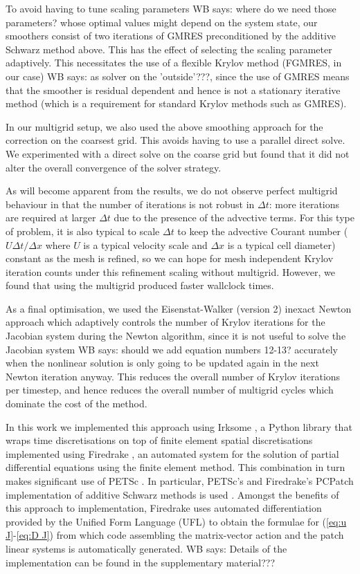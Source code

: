 \documentclass[a4paper, 12pt]{article}
\newcommand{\werner}[1]{{\color{magenta}WB says: #1}}
\begin{document}
To avoid having to tune scaling parameters \werner{where do we need those parameters?} whose optimal values might
depend on the system state, our smoothers consist of two iterations of
GMRES preconditioned by the additive Schwarz method above. This has
the effect of selecting the scaling parameter adaptively.  This
necessitates the use of a flexible Krylov method (FGMRES, in our
case) \werner{as solver on the 'outside'???}, since the use of GMRES means that the smoother is residual
dependent and hence is not a stationary iterative method (which is a
requirement for standard Krylov methods such as GMRES).

In our multigrid setup, we also used the above smoothing approach for
the correction on the coarsest grid. This avoids having to use a
parallel direct solve. We experimented with a direct solve on the coarse
grid but found that it did not alter the overall convergence of the
solver strategy.

As will become apparent from the results, we do not observe perfect
multigrid behaviour in that the number of iterations is not robust in
$\Delta t$: more iterations are required at larger $\Delta t$ due to
the presence of the advective terms.  For this type of problem, it is
also typical to scale $\Delta t$ to keep the advective Courant number
($U\Delta t/\Delta x$ where $U$ is a typical velocity scale and
$\Delta x$ is a typical cell diameter) constant as the mesh is
refined, so we can hope for mesh independent Krylov iteration counts
under this refinement scaling without multigrid. However, we found
that using the multigrid produced faster wallclock times.

As a final optimisation, we used the Eisenstat-Walker (version 2)
inexact Newton approach \citep{eisenstat1996choosing} which adaptively
controls the number of Krylov iterations for the Jacobian system
during the Newton algorithm, since it is not useful to solve the
Jacobian system \werner{should we add equation numbers 12-13?} accurately when the nonlinear solution is only going
to be updated again in the next Newton iteration anyway. This reduces the overall
number of Krylov iterations per timestep, and hence reduces the overall
number of multigrid cycles which dominate the cost of the method.

In this work we implemented this approach using Irksome
\citep{farrell2021irksome,kirby2024extending}, a Python library that
wraps time discretisations on top of finite element spatial
discretisations implemented using Firedrake
\citep{FiredrakeUserManual}, an automated system for the solution of
partial differential equations using the finite element method.  This
combination in turn makes significant use of PETSc
\citep{dalcin2011parallel,balay2019petsc}. In particular, PETSc's and
Firedrake's PCPatch implementation of additive Schwarz methods is used
\citep{farrell2021pcpatch}.  Amongst the benefits of this approach to
implementation, Firedrake uses automated differentiation provided by
the Unified Form Language (UFL) \citep{alnaes2012ufl} to obtain the
formulae for (\ref{eq:u J}-\ref{eq:D J}) from which code assembling
the matrix-vector action and the patch linear systems is automatically
generated.
\werner{Details of the implementation can be found in the supplementary material???}
\end{document}
